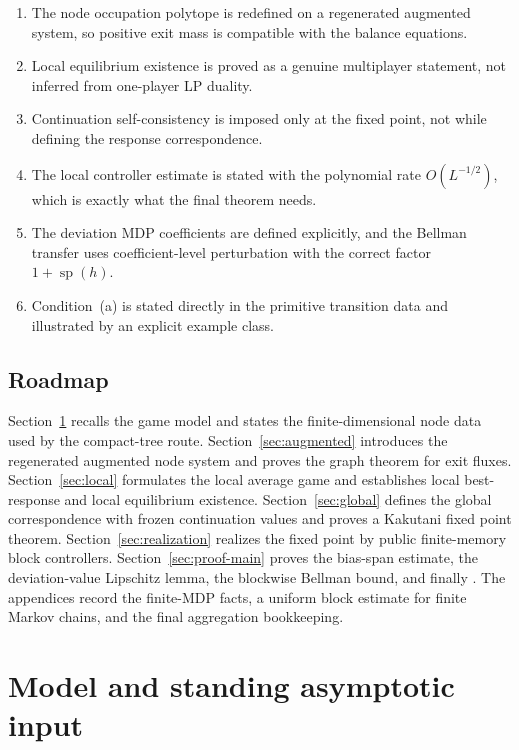 \documentclass[12pt]{article}
\theoremstyle{definition}
\newcommand{\1}{\mathbf{1}}
\DeclareMathOperator{\spn}{sp}
\begin{document}
\begin{enumerate}[label=\textnormal{(\arabic*)},leftmargin=2.4em]
\item The node occupation polytope is redefined on a regenerated augmented system,
so positive exit mass is compatible with the balance equations.
\item Local equilibrium existence is proved as a genuine multiplayer statement,
not inferred from one-player LP duality.
\item Continuation self-consistency is imposed only at the fixed point, not while
defining the response correspondence.
\item The local controller estimate is stated with the polynomial rate
$O(L^{-1/2})$, which is exactly what the final theorem needs.
\item The deviation MDP coefficients are defined explicitly, and the Bellman
transfer uses coefficient-level perturbation with the correct factor
$1+\spn(h)$.
\item Condition~\textnormal{(a)} is stated directly in the primitive transition
data and illustrated by an explicit example class.
\end{enumerate}

\subsection{Roadmap}

Section~\ref{sec:model} recalls the game model and states the finite-dimensional
node data used by the compact-tree route.  Section~\ref{sec:augmented} introduces
the regenerated augmented node system and proves the graph theorem for exit fluxes.
Section~\ref{sec:local} formulates the local average game and establishes local
best-response and local equilibrium existence.  Section~\ref{sec:global} defines
the global correspondence with frozen continuation values and proves a Kakutani
fixed point theorem.  Section~\ref{sec:realization} realizes the fixed point by
public finite-memory block controllers.  Section~\ref{sec:proof-main} proves the
bias-span estimate, the deviation-value Lipschitz lemma, the blockwise Bellman
bound, and finally .  The appendices record the finite-MDP facts,
a uniform block estimate for finite Markov chains, and the final aggregation
bookkeeping.

\section{Model and standing asymptotic input}
\label{sec:model}
\end{document}
